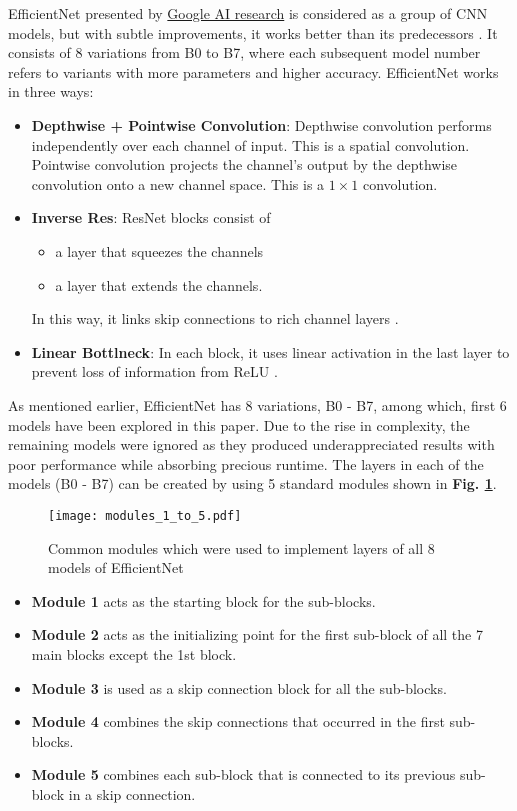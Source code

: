 \documentclass[conference]{IEEEtran}
\begin{document}
EfficientNet presented by \href{https://ai.google/research/}{Google AI research} is considered as a group of CNN models, but with subtle improvements, it works better than its predecessors \cite{tan2019efficientnet}. It consists of 8 variations from B0 to B7, where each subsequent model number refers to variants with more parameters and higher accuracy. EfficientNet works in three ways:
\begin{itemize}
    \item \textbf{Depthwise + Pointwise Convolution}: Depthwise convolution performs independently over each channel of input. This is a spatial convolution. Pointwise convolution projects the channel's output by the depthwise convolution onto a new channel space. This is a $1\times1$ convolution.
    \item \textbf{Inverse Res}: ResNet blocks consist of 
    \begin{itemize} 
        \item a layer that squeezes the channels
        \item a layer that extends the channels. 
    \end{itemize}
    In this way, it links skip connections to rich channel layers \cite{he2016deep}.
    \item \textbf{Linear Bottlneck}: In each block, it uses linear activation in the last layer to prevent loss of information from ReLU \cite{agarap2018deep}. 
\end{itemize}


As mentioned earlier, EfficientNet has 8 variations, B0 - B7, among which, first 6 models have been explored in this paper. Due to the rise in complexity, the remaining models were ignored as they produced underappreciated results with poor performance while absorbing precious runtime. The layers in each of the models (B0 - B7) can be created by using 5 standard modules shown in \textbf{Fig. \ref{Common_blocks}}. 

\begin{figure}[h!]
    \centering
    \texttt{[image: modules\_1\_to\_5.pdf]}
    \caption{Common modules which were used to implement layers of all 8 models of EfficientNet}
    \label{Common_blocks}
\end{figure}

\begin{itemize}
    \item \textbf{Module 1} acts as the starting block for the sub-blocks.
    \item \textbf{Module 2} acts as the initializing point for the first sub-block of all the 7 main blocks except the 1st block.
    \item \textbf{Module 3} is used as a skip connection block for all the sub-blocks.
    \item \textbf{Module 4} combines the skip connections that occurred in the first sub-blocks.
    \item \textbf{Module 5} combines each sub-block that is connected to its previous sub-block in a skip connection.
\end{itemize}
\end{document}
